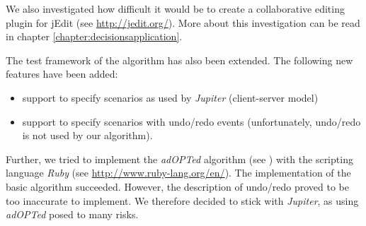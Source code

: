 We also investigated how difficult it would be to create a collaborative 
editing plugin for jEdit (see \href{http://jedit.org/}{http://jedit.org/}).
More about this investigation can be read in chapter 
\ref{chapter:decisionsapplication}.

The test framework of the algorithm has also been extended. The following 
new features have been added:
\begin{itemize}
 \item support to specify scenarios as used by \emph{Jupiter} (client-server model)
 \item support to specify scenarios with undo/redo events (unfortunately, undo/redo is not used by our algorithm).
\end{itemize}

Further, we tried to implement the \emph{adOPTed} algorithm (see 
\cite{ressel96}) with the scripting language \emph{Ruby} (see
\href{http://www.ruby-lang.org/en/}{http://www.ruby-lang.org/en/}). The
implementation of the basic algorithm succeeded. However, the description
of undo/redo proved to be too inaccurate to implement. We therefore 
decided to stick with \emph{Jupiter}, as using \emph{adOPTed} posed to many
risks.
